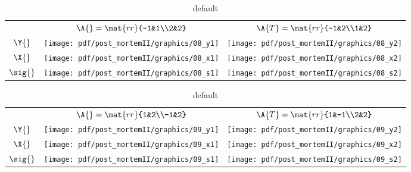 \begin{table}[htdp]
\begin{center}
\begin{tabular}{ccc}
 & $\A{}  = \mat{rr}{-1&1\\2&2}$ 
 & $\A{T} = \mat{rr}{-1&2\\1&2}$ \\[35pt]
 $\Y{}$   & \qquad \texttt{[image: pdf/post\_mortemII/graphics/08\_y1]} 
          & \qquad \texttt{[image: pdf/post\_mortemII/graphics/08\_y2]} \\[15pt]
 $\X{}$   & \qquad \texttt{[image: pdf/post\_mortemII/graphics/08\_x1]}
          & \qquad \texttt{[image: pdf/post\_mortemII/graphics/08\_x2]} \\[20pt]
 $\sig{}$ &        \texttt{[image: pdf/post\_mortemII/graphics/08\_s1]}
          &        \texttt{[image: pdf/post\_mortemII/graphics/08\_s2]} \\[20pt]
\end{tabular}
\end{center}
\label{tab:pmII:visualsh}
\caption{default}
\end{table}%
\clearpage

\begin{table}[htdp]
\begin{center}
\begin{tabular}{ccc}
 & $\A{}  = \mat{rr}{1&2\\-1&2}$ 
 & $\A{T} = \mat{rr}{1&-1\\2&2}$ \\[35pt]
 $\Y{}$   & \qquad \texttt{[image: pdf/post\_mortemII/graphics/09\_y1]} 
          & \qquad \texttt{[image: pdf/post\_mortemII/graphics/09\_y2]} \\[15pt]
 $\X{}$   & \qquad \texttt{[image: pdf/post\_mortemII/graphics/09\_x1]}
          & \qquad \texttt{[image: pdf/post\_mortemII/graphics/09\_x2]} \\[20pt]
 $\sig{}$ & \quad  \texttt{[image: pdf/post\_mortemII/graphics/09\_s1]}
          & \quad  \texttt{[image: pdf/post\_mortemII/graphics/09\_s2]} \\[20pt]
\end{tabular}
\end{center}
\label{tab:pmII:visualsi}
\caption{default}
\end{table}%
\clearpage

\endinput